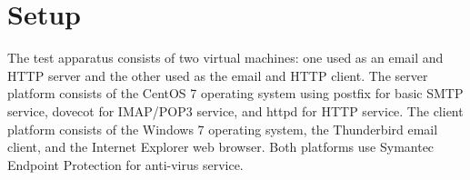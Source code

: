 \documentclass[10pt,conference]{IEEEtran}
\begin{document}
%






\section{Setup}
The test apparatus consists of two virtual machines: one used as an email and HTTP
server and the other used as the email and HTTP client.  The server platform consists of the
CentOS 7 operating system using postfix for basic SMTP service, dovecot for IMAP/POP3
service, and httpd for HTTP service. The client platform consists of the Windows 7 operating
system, the Thunderbird email client, and the Internet Explorer web browser. Both platforms
use Symantec Endpoint Protection for anti-virus service.
\end{document}

